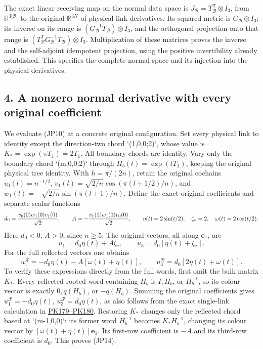 \documentclass[11pt]{article}
\begin{document}
The exact linear receiving map on the normal data space is
\(J_{\mathcal B}=T_{\mathcal B}^{\mathsf T}\otimes I_3\),
from \(\mathbb R^{3|\mathcal B|}\) to the original
\(\mathbb R^{3N}\) of physical link derivatives. Its squared metric
is \(G_{\mathcal B}\otimes I_3\); its inverse on its range is
\((G_{\mathcal B}^{-1}T_{\mathcal B})\otimes I_3\), and the
orthogonal projection onto that range is
\((T_{\mathcal B}^{\mathsf T}G_{\mathcal B}^{-1}T_{\mathcal B})
\otimes I_3\). Multiplication of these matrices proves the inverse
and the self-adjoint idempotent projection, using the positive
invertibility already established. This specifies the complete normal
space and its injection into the physical derivatives.

\subsection*{4. A nonzero normal derivative with every original coefficient}

We evaluate (JP10) at a concrete original configuration. Set every
physical link to identity except the direction-two chord `(1,0,0;2)`,
whose value is \(K_*=\exp(\pi T_1)=2T_1\). All boundary chords are
identity. Vary only the boundary chord `(m,0,0;2)` through
\(H_b(t)=\exp(tT_1)\), keeping the original physical tree identity.
With \(h=\pi/(2n)\), retain the original cochains
\(v_0(l)=n^{-1/2}\),
\(v_1(l)=\sqrt{2/n}\cos(\pi(l+1/2)/n)\), and
\(w_1(l)=-\sqrt{2/n}\sin(\pi(l+1)/n)\).
Define the exact original coefficients and separate scalar functions
\[
 d_0={v_0(0)w_1(0)v_1(0)\over\sqrt2},\qquad
 A=-{v_1(1)w_1(0)v_0(0)\over\sqrt2},\qquad
 \eta(t)=2\sin(t/2),\quad \zeta_*=2,\quad \omega(t)=2\cos(t/2).
\]
Here \(d_0<0\), \(A>0\), since \(n\ge5\). The original vectors,
all along \(\mathbf e_1\), are
\[
 u_1=d_0\eta(t)+A\zeta_*,\qquad u_3=d_0[\eta(t)+\zeta_*].
\]
For the full reflected vectors one obtains
\[
 u_1^{\mathcal R}=-d_0\eta(t)-A[\omega(t)+\eta(t)],\qquad
 u_3^{\mathcal R}=d_0[2\eta(t)+\omega(t)].\tag{JP14}
\]
To verify these expressions directly from the full words, first omit
the bulk matrix \(K_*\). Every reflected rooted word containing \(H_b\) is
\(I,H_b\), or \(H_b^{-1}\), so its colour vector is exactly \(0,q(H_b)\),
or \(-q(H_b)\). Summing the original coefficients gives
\(u_1^{\mathcal R}=-d_0\eta(t)\), \(u_3^{\mathcal R}=d_0\eta(t)\), as
also follows from the exact single-link calculation in
\href{https://github.com/KokunoYumeto/yang-mills-interacting-workbench/blob/485b61423c1f4e1805deb453c1b6b342b27842b6/yang-mills/continuations/20260930-s6-ns-moment-map-bridge/PERIOD_COUPLING_AND_PHYSICAL_KERNELS.md#L4025}{PK179–PK180}.
Restoring \(K_*\) changes only the reflected chord based at `(m-1,0,0)`:
its former word \(H_b^{-1}\) becomes \(K_*H_b^{-1}\), changing its colour
vector by \([\omega(t)+\eta(t)]\mathbf e_1\). Its first-row coefficient is
\(-A\) and its third-row coefficient is \(d_0\). This proves (JP14).
\end{document}
